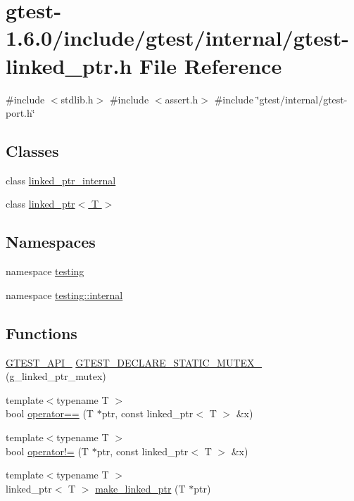 \hypertarget{gtest-linked__ptr_8h}{\section{gtest-\/1.6.0/include/gtest/internal/gtest-\/linked\-\_\-ptr.h \-File \-Reference}
\label{d0/d03/gtest-linked__ptr_8h}
}
{\ttfamily \#include $<$stdlib.\-h$>$}\*
{\ttfamily \#include $<$assert.\-h$>$}\*
{\ttfamily \#include \char`\"{}gtest/internal/gtest-\/port.\-h\char`\"{}}\*
\subsection*{\-Classes}
\begin{DoxyCompactItemize}
\item 
class \hyperlink{classtesting_1_1internal_1_1linked__ptr__internal}{linked\-\_\-ptr\-\_\-internal}
\item 
class \hyperlink{classtesting_1_1internal_1_1linked__ptr}{linked\-\_\-ptr$<$ T $>$}
\end{DoxyCompactItemize}
\subsection*{\-Namespaces}
\begin{DoxyCompactItemize}
\item 
namespace \hyperlink{namespacetesting}{testing}
\item 
namespace \hyperlink{namespacetesting_1_1internal}{testing\-::internal}
\end{DoxyCompactItemize}
\subsection*{\-Functions}
\begin{DoxyCompactItemize}
\item 
\hyperlink{gtest-port_8h_aa73be6f0ba4a7456180a94904ce17790}{\-G\-T\-E\-S\-T\-\_\-\-A\-P\-I\-\_\-} \hyperlink{namespacetesting_1_1internal_ac3264688a9e330c9b52f558600c7692f}{\-G\-T\-E\-S\-T\-\_\-\-D\-E\-C\-L\-A\-R\-E\-\_\-\-S\-T\-A\-T\-I\-C\-\_\-\-M\-U\-T\-E\-X\-\_\-} (g\-\_\-linked\-\_\-ptr\-\_\-mutex)
\item 
{\footnotesize template$<$typename T $>$ }\\bool \hyperlink{namespacetesting_1_1internal_a85cd9c54c98ea519daae80cd8ec811ff}{operator==} (\-T $\ast$ptr, const linked\-\_\-ptr$<$ \-T $>$ \&x)
\item 
{\footnotesize template$<$typename T $>$ }\\bool \hyperlink{namespacetesting_1_1internal_a42660b6e8eb1abbf38d4d422b513ab05}{operator!=} (\-T $\ast$ptr, const linked\-\_\-ptr$<$ \-T $>$ \&x)
\item 
{\footnotesize template$<$typename T $>$ }\\linked\-\_\-ptr$<$ \-T $>$ \hyperlink{namespacetesting_1_1internal_a9cad82ae901e42506d66e82cab74197f}{make\-\_\-linked\-\_\-ptr} (\-T $\ast$ptr)
\end{DoxyCompactItemize}

